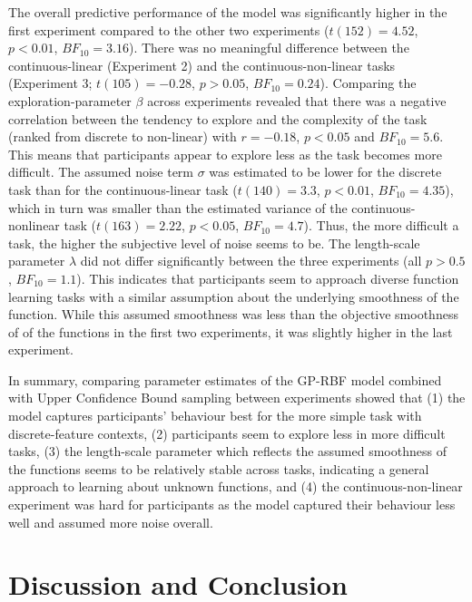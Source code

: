 \documentclass[a4paper,natbib]{apa6}
\begin{document}
The overall predictive performance of the model was significantly higher in the first experiment compared to the other two experiments ($t(152)=4.52$, $p<0.01$,  $BF_{10}= 3.16$). There was no meaningful difference between the continuous-linear (Experiment 2) and the continuous-non-linear tasks (Experiment 3; $t(105)=-0.28$, $p>0.05$, $BF_{10}= 0.24$). Comparing the exploration-parameter $\beta$ across experiments revealed that there was a negative correlation between the tendency to explore and the complexity of the task (ranked from discrete to non-linear) with $r=-0.18$, $p<0.05$ and $BF_{10}= 5.6$. This means that participants appear to explore less as the task becomes more difficult. The assumed noise term $\sigma$ was estimated to be lower for the discrete task than for the continuous-linear task ($t(140)= 3.3$, $p<0.01$, $BF_{10}=  4.35$),  which in turn was smaller than the estimated variance of the continuous-nonlinear task ($t(163)=2.22$, $p<0.05$, $BF_{10}=4.7$). Thus, the more difficult a task, the higher the subjective level of noise seems to be. The length-scale parameter $\lambda$ did not differ significantly between the three experiments (all $p>0.5$, $BF_{10}=1.1$). This indicates that participants seem to approach diverse function learning tasks with a similar assumption about the underlying smoothness of the function. While this assumed smoothness was less than the objective smoothness of of the functions in the first two experiments, it was slightly higher in the last experiment.

In summary, comparing parameter estimates of the GP-RBF model combined with Upper Confidence Bound sampling between experiments showed that (1) the model captures participants' behaviour best for the more simple task with discrete-feature contexts, (2) participants seem to explore less in more difficult tasks, (3) the length-scale parameter which reflects the assumed smoothness of the functions seems to be relatively stable across tasks, indicating a general approach to learning about unknown functions, and (4) the continuous-non-linear experiment was hard for participants as the model captured their behaviour less well and assumed more noise overall.


\section{Discussion and Conclusion}
\end{document}

